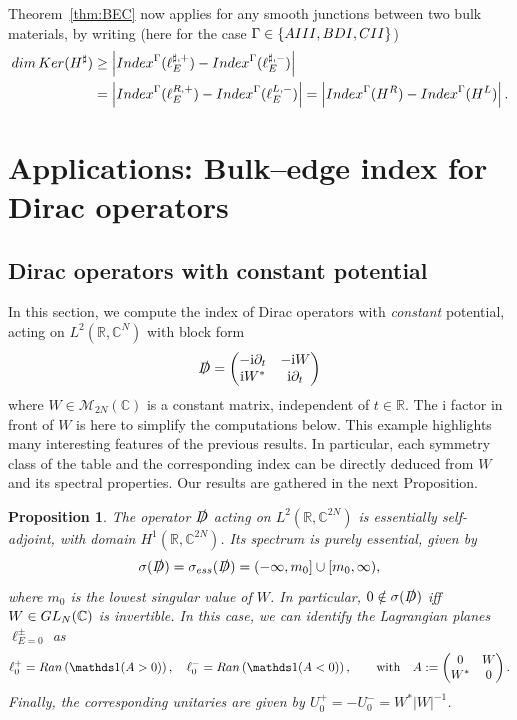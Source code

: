 \documentclass[11pt]{amsart}
\numberwithin{equation}{section} %
\newtheorem{proposition}[theorem]{Proposition}
\newcommand\1{{\mathds 1}}
\def\C{{\mathbb C}}
\def\R{{\mathbb R}}
\def\ri{{\mathrm{i}}}
\def\cM{{\mathcal M}}
\def\rAIII{{\rm AIII}}
\def\rBDI{{\rm BDI}}
\def\rCII{{\rm CII}}
\def\Index{{\rm Index}}
\def\Ker{{\rm Ker }}
\def\Ran{{\rm Ran }}
\def\dim{{\rm dim }}
\def\Dirac{\slashed{D}} %
\begin{document}
\medskip

Theorem~\ref{thm:BEC} now applies for any smooth junctions between two bulk materials, by writing (here for the case $\Gamma \in \{ \rAIII, \rBDI, \rCII \}$)
\begin{align*}
    \dim \, \Ker (H^\sharp) & \ge \left| \Index^\Gamma( \ell_E^{\sharp, +}) - \Index^\Gamma( \ell_E^{\sharp, -}) \right| \\
    & = \left| \Index^\Gamma( \ell_E^{R, +}) - \Index^\Gamma( \ell_E^{L, -}) \right|
     = \left| \Index^\Gamma(H^R) - \Index^\Gamma(H^L) \right|.
\end{align*}


\section{Applications: Bulk--edge index for Dirac operators}
\label{sec:application_cst_Dirac}

\subsection{Dirac operators with constant potential}
In this section, we compute the index of  Dirac operators with {\em constant} potential, acting on $L^2(\R, \C^N)$ with block form
\[
\Dirac = \begin{pmatrix}
    - \ri \partial_t & - \ri W \\ \ri W^* & \ri \partial_t
\end{pmatrix}
\]
where $W \in \cM_{2N}(\C)$ is a constant matrix, independent of $t \in \R$. The $\ri$ factor in front of $W$ is here to simplify the computations below. This example highlights many interesting features of the previous results. In particular, each symmetry class of the table and the corresponding index can be directly deduced from $W$ and its spectral properties. Our results are gathered in the next Proposition. 

\begin{proposition}
    The operator $\Dirac$ acting on $L^2(\R, \C^{2N})$ is essentially self-adjoint, with domain $H^1(\R, \C^{2N})$. Its spectrum is purely essential, given by
    \[
    \sigma (\Dirac) = \sigma_{\rm ess}(\Dirac) =  (- \infty, m_0] \cup [ m_0, \infty),
    \]
    where $m_0$ is the lowest singular value of $W$. In particular, $0 \notin \sigma(\Dirac)$ iff $W \in {\rm GL}_N(\C)$ is invertible. In this case, we can identify the Lagrangian planes $\ell_{E = 0}^\pm$ as
    \[
        \ell_0^+ = \Ran \left(  \1( A > 0 ) \right) , \quad \ell_0^- =  \Ran \left( \1(A < 0) \right) , \qquad \text{with} \quad A := \begin{pmatrix}
            0 & W \\ W^* & 0
        \end{pmatrix}.
    \]
    Finally, the corresponding unitaries are given by $U_0^+ = - U_0^- = W^* | W |^{-1}$.
\end{proposition}
\end{document}
